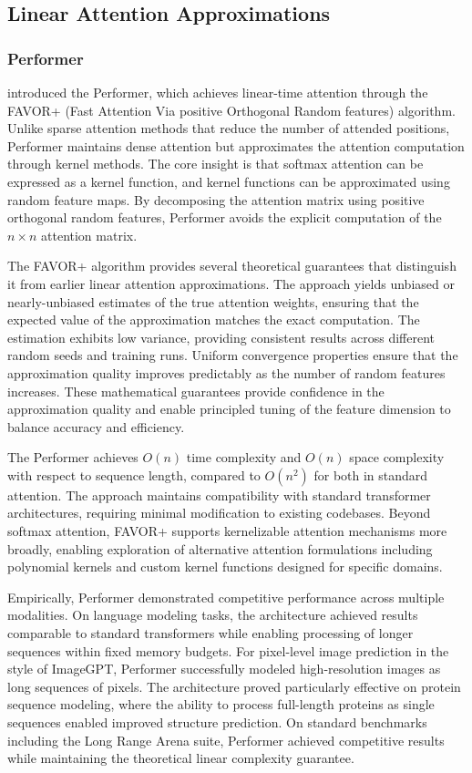 \documentclass[11pt,letterpaper]{article}
\begin{document}
\subsection{Linear Attention Approximations}

\subsubsection{Performer}

\cite{choromanski2021rethinking} introduced the Performer, which achieves linear-time attention through the FAVOR+ (Fast Attention Via positive Orthogonal Random features) algorithm. Unlike sparse attention methods that reduce the number of attended positions, Performer maintains dense attention but approximates the attention computation through kernel methods. The core insight is that softmax attention can be expressed as a kernel function, and kernel functions can be approximated using random feature maps. By decomposing the attention matrix using positive orthogonal random features, Performer avoids the explicit computation of the $n \times n$ attention matrix.

The FAVOR+ algorithm provides several theoretical guarantees that distinguish it from earlier linear attention approximations. The approach yields unbiased or nearly-unbiased estimates of the true attention weights, ensuring that the expected value of the approximation matches the exact computation. The estimation exhibits low variance, providing consistent results across different random seeds and training runs. Uniform convergence properties ensure that the approximation quality improves predictably as the number of random features increases. These mathematical guarantees provide confidence in the approximation quality and enable principled tuning of the feature dimension to balance accuracy and efficiency.

The Performer achieves $O(n)$ time complexity and $O(n)$ space complexity with respect to sequence length, compared to $O(n^2)$ for both in standard attention. The approach maintains compatibility with standard transformer architectures, requiring minimal modification to existing codebases. Beyond softmax attention, FAVOR+ supports kernelizable attention mechanisms more broadly, enabling exploration of alternative attention formulations including polynomial kernels and custom kernel functions designed for specific domains.

Empirically, Performer demonstrated competitive performance across multiple modalities. On language modeling tasks, the architecture achieved results comparable to standard transformers while enabling processing of longer sequences within fixed memory budgets. For pixel-level image prediction in the style of ImageGPT, Performer successfully modeled high-resolution images as long sequences of pixels. The architecture proved particularly effective on protein sequence modeling, where the ability to process full-length proteins as single sequences enabled improved structure prediction. On standard benchmarks including the Long Range Arena suite, Performer achieved competitive results while maintaining the theoretical linear complexity guarantee.
\end{document}
